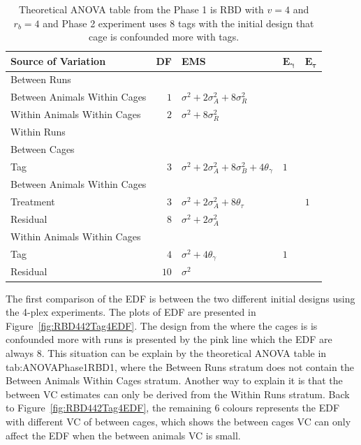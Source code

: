 \documentclass[12pt,a4paper]{article}
\begin{document}
\begin{table}[ht]
\centering
 \caption{Theoretical ANOVA table from the Phase 1 is RBD with $v = 4$ and $r_b = 4$ and Phase 2 experiment uses 8 tags with the initial design that cage is confounded more with tags.}
 \begin{tabular}[t]{lrlll} 
 \toprule 
 \multicolumn{1}{l}{\textbf{Source of Variation}} & \multicolumn{1}{l}{\textbf{DF}} & \multicolumn{1}{l}{\textbf{EMS}}& \multicolumn{1}{l}{$\bm{E_{\gamma}}$}&\multicolumn{1}{l}{$\bm{E_{\tau}}$}\\ 
 \midrule 
 Between Runs &  &  & & \\ 
 \quad Between Animals Within Cages & $1$ & $\sigma^2+2\sigma_{A}^2+8\sigma_{R}^2$ & & \\ 
 \quad Within Animals Within Cages & $2$ & $\sigma^2+8\sigma_{R}^2$ & & \\ \hline 
 Within Runs &  &  & & \\ 
 \quad Between Cages &  &  & & \\ 
 \quad \quad Tag & $3$ & $\sigma^2+2\sigma_{A}^2+8\sigma_{B}^2+4\theta_{\gamma}$ &$1$ & \\ \hline 
 \quad Between Animals Within Cages &  &  & & \\ 
 \quad \quad Treatment & $3$ & $\sigma^2+2\sigma_{A}^2+8\theta_{\tau}$ & & $1$\\ 
 \quad \quad Residual & $8$ & $\sigma^2+2\sigma_{A}^2$ & & \\ \hline 
 \quad Within Animals Within Cages &  &  & & \\ 
 \quad \quad Tag & $4$ & $\sigma^2+4\theta_{\gamma}$ &$1$ & \\ 
 \quad \quad Residual & $10$ & $\sigma^2$ & & \\ 
 \bottomrule 
 \end{tabular} 
 \label{tab:ANOVAPhase1RBD4} 
\end{table} 

The first comparison of the EDF is between the two different initial designs using the 4-plex experiments. The plots of EDF are presented in Figure~\ref{fig:RBD442Tag4EDF}. The design from the where the cages is is confounded more with runs is presented by the pink line which the EDF are always 8. This situation can be explain by the theoretical ANOVA table in {tab:ANOVAPhase1RBD1}, where the Between Runs stratum does not contain the Between Animals Within Cages stratum. Another way to explain it is that the between VC estimates can only be derived from the Within Runs stratum. Back to Figure~\ref{fig:RBD442Tag4EDF}, the remaining 6 colours represents the EDF with different VC of between cages, which shows the between cages VC can only affect the EDF when the between animals VC is small.  
\end{document}
